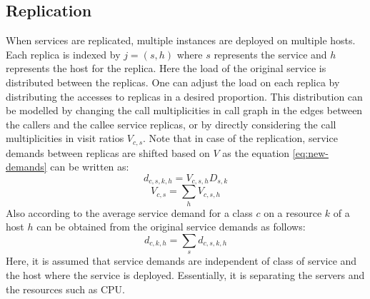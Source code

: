  \subsection{Replication} 
 When services are replicated, multiple instances are deployed on multiple hosts. Each replica is indexed by $j=(s,h)$ where $s$ represents the service and $h$ represents the host for the replica. Here the load of the original service is distributed between the replicas.
 One can adjust the load on each replica by distributing the accesses to replicas in a desired proportion. This distribution can be modelled by changing the call multiplicities in call graph in the edges between the callers and the callee service replicas, or by directly considering the call multiplicities in visit ratios $V_{c,s}$.  
  Note that in case of the replication, service demands between replicas are shifted based on $V$ as the equation \ref{eq:new-demands} can be written as:
   \[ d_{c,s,k,h}=  V_{c,s,h} D_{s,k} \] 
   \[V_{c,s} = \sum_h V_{c,s,h} \]
   Also according to \cite{menasce1999methodology} the average service demand for a class $c$ on a resource $k$ of a host $h$ can be obtained from the original service demands as follows: 
   \[ d_{c,k,h}=\sum_s d_{c,s,k,h} \]  
  Here, it is assumed that service demands are independent of class of service and the host where the service is deployed. Essentially, it is separating the servers and the resources such as CPU. 


